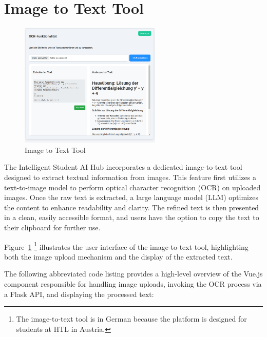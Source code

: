 \newpage

\section{Image to Text Tool}

\begin{figure}
  \centering
  \includegraphics[width=0.6\textwidth]{figures/OCR-functonalatie.png}
  \caption{Image to Text Tool}
  \label{fig:image-to-text-tool}
\end{figure}

The Intelligent Student AI Hub incorporates a dedicated image-to-text tool designed to extract textual information from images. 
This feature first utilizes a text-to-image model to perform optical character recognition (OCR) on uploaded images. Once the raw text is extracted, 
a large language model (LLM) optimizes the content to enhance readability and clarity. The refined text is then presented in a clean, easily accessible format, 
and users have the option to copy the text to their clipboard for further use.

Figure~\ref{fig:image-to-text-tool} \footnote{The image-to-text tool is in German because the platform is designed for students at HTL in Austria.}
illustrates the user interface of the image-to-text tool, highlighting both the image upload mechanism and the display of the extracted text.

The following abbreviated code listing provides a high-level overview of the Vue.js component responsible for handling image uploads, invoking the OCR process via a Flask API, and displaying the processed text:

